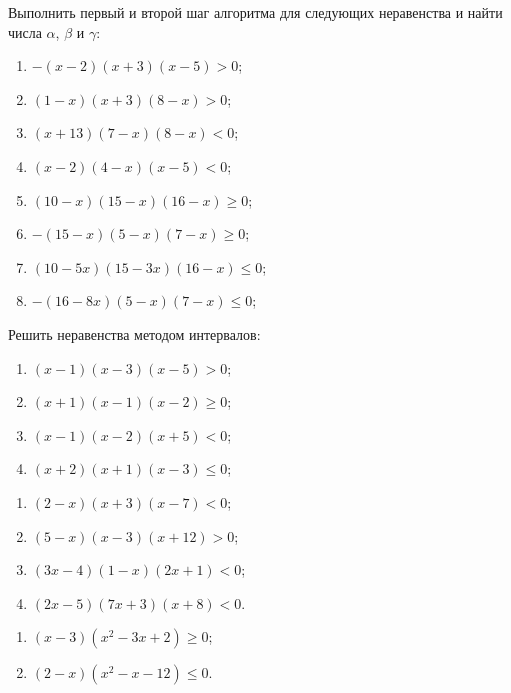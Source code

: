 \documentclass[algebra,twocolumn]{pum}
\begin{document}
\begin{exercises}
  \begin{question}
    Выполнить первый и второй шаг алгоритма для следующих неравенства и найти числа $\alpha$, $\beta$ и $\gamma$:
    \begin{enumerate}
      \item $-(x-2)(x+3)(x-5)>0$;
      \item $(1-x)(x+3)(8-x)>0$;
      \item $(x+13)(7-x)(8-x)<0$;
      \item $(x-2)(4-x)(x-5)<0$;
      \item $(10-x)(15-x)(16-x)\ge0$;
      \item $-(15-x)(5-x)(7-x)\ge0$;
      \item $(10-5x)(15-3x)(16-x)\le0$;
      \item $-(16-8x)(5-x)(7-x)\le0$;
    \end{enumerate}
  \end{question}
  Решить неравенства методом интервалов:
  \begin{question}
    \vspace{-13pt}
      \begin{enumerate}
        \item $(x-1)(x-3)(x-5)>0$;
        \item $(x+1)(x-1)(x-2)\ge0$;
        \item $(x-1)(x-2)(x+5)<0$;
        \item $(x+2)(x+1)(x-3)\le0$;
      \end{enumerate}
  \end{question}
  \begin{question}
    \vspace{-13pt}
      \begin{enumerate}
        \item $(2-x)(x+3)(x-7)<0$;
        \item $(5-x)(x-3)(x+12)>0$;
        \item $(3x-4)(1-x)(2x+1)<0$;
        \item $(2x-5)(7x+3)(x+8)<0$.
      \end{enumerate}
  \end{question}
  \begin{question}
    \vspace{-13pt}
      \begin{enumerate}
        \item $(x-3)(x^2-3x+2)\ge0$;
        \item $(2-x)(x^2-x-12)\le0$.

\end{enumerate}
\end{question}
\end{exercises}
\end{document}
